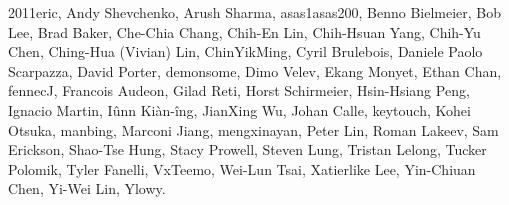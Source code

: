 2011eric,                      %
Andy Shevchenko,               %
Arush Sharma,                  %
asas1asas200,                  %
Benno Bielmeier,               %
Bob Lee,                       %
Brad Baker,                    %
Che-Chia Chang,                %
Chih-En Lin,                   %
Chih-Hsuan Yang,               %
Chih-Yu Chen,                  %
Ching-Hua (Vivian) Lin,        %
ChinYikMing,                   %
Cyril Brulebois,               %
Daniele Paolo Scarpazza,       %
David Porter,                  %
demonsome,                     %
Dimo Velev,                    %
Ekang Monyet,                  %
Ethan Chan,                    %
fennecJ,                       %
Francois Audeon,               %
Gilad Reti,                    %
Horst Schirmeier,              %
Hsin-Hsiang Peng,              %
Ignacio Martin,                %
Iûnn Kiàn-îng,                 %
JianXing Wu,                   %
Johan Calle,                   %
keytouch,                      %
Kohei Otsuka,                  %
manbing,                       %
Marconi Jiang,                 %
mengxinayan,                   %
Peter Lin,                     %
Roman Lakeev,                  %
Sam Erickson,                  %
Shao-Tse Hung,                 %
Stacy Prowell,                 %
Steven Lung,                   %
Tristan Lelong,                %
Tucker Polomik,                %
Tyler Fanelli,                 %
VxTeemo,                       %
Wei-Lun Tsai,                  %
Xatierlike Lee,                %
Yin-Chiuan Chen,               %
Yi-Wei Lin,                    %
Ylowy.                         %

